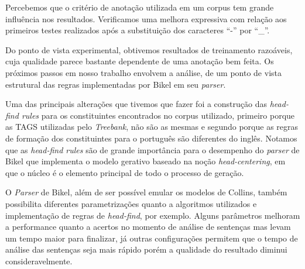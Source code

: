 Percebemos que o critério de anotação utilizada em um corpus tem grande influência nos resultados. Verificamos uma melhora expressiva com relação aos primeiros testes realizados após a substituição dos caracteres ``{-}'' por ``\_''.

Do ponto de vista experimental, obtivemos resultados de treinamento razoáveis, cuja qualidade parece bastante dependente de uma anotação bem feita. Os próximos passos em nosso trabalho envolvem a análise, de um ponto de vista estrutural das regras implementadas por Bikel em seu \emph{parser}.

Uma das principais alterações que tivemos que fazer foi a construção das \emph{head-find rules} para os constituintes encontrados no corpus utilizado, primeiro porque as TAGS utilizadas pelo \emph{Treebank}, não são as mesmas e segundo porque as regras de formação dos constituintes para o português são diferentes do inglês. Notamos que as \emph{head-find rules} são de grande importância para o desempenho do \emph{parser} de Bikel que implementa o modelo gerativo baseado na noção \emph{head-centering}, em que o núcleo é o elemento principal de todo o processo de geração.

O \emph{Parser} de Bikel, além de ser possível emular os modelos de Collins, também possibilita diferentes parametrizações quanto a algoritmos utilizados e implementação de regras de \emph{head-find}, por exemplo. Alguns parâmetros melhoram a performance quanto a acertos no momento de análise de sentenças mas levam um tempo maior para finalizar, já outras configurações permitem que o tempo de análise das sentenças seja mais rápido porém a qualidade do resultado diminui consideravelmente.



